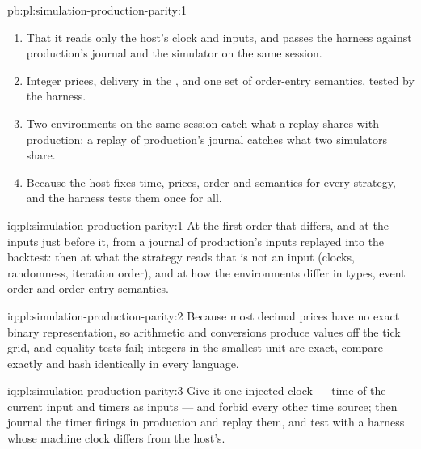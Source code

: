 \begin{solution}{pb:pl:simulation-production-parity:1}
\begin{enumerate}
after 2, affecting 539, 1\,686, 387 and 8\,449 outputs in the hour; with the fixes, production-shaped, simulator and replay runs agree on
every output of ten sessions.
\item That it reads only the host's clock and inputs, and passes the harness against production's journal and the simulator on the same
session.
\item Integer prices, delivery in the , and one set of order-entry semantics, tested by the harness.
\item Two environments on the same session catch what a replay shares with production; a replay of production's journal catches what two
simulators share.
\item Because the host fixes time, prices, order and semantics for every strategy, and the harness tests them once for all.
\end{enumerate}
\end{solution}

\begin{solution}{iq:pl:simulation-production-parity:1}
At the first order that differs, and at the inputs just before it, from a journal of production's inputs replayed into the backtest: then at
what the strategy reads that is not an input (clocks, randomness, iteration order), and at how the environments differ in types, event order
and order-entry semantics.
\end{solution}

\begin{solution}{iq:pl:simulation-production-parity:2}
Because most decimal prices have no exact binary representation, so arithmetic and conversions produce values off the tick grid, and equality
tests fail; integers in the smallest unit are exact, compare exactly and hash identically in every language.
\end{solution}

\begin{solution}{iq:pl:simulation-production-parity:3}
Give it one injected clock --- time of the current input and timers as inputs --- and forbid every other time source; then journal the timer
firings in production and replay them, and test with a harness whose machine clock differs from the host's.
\end{solution}

